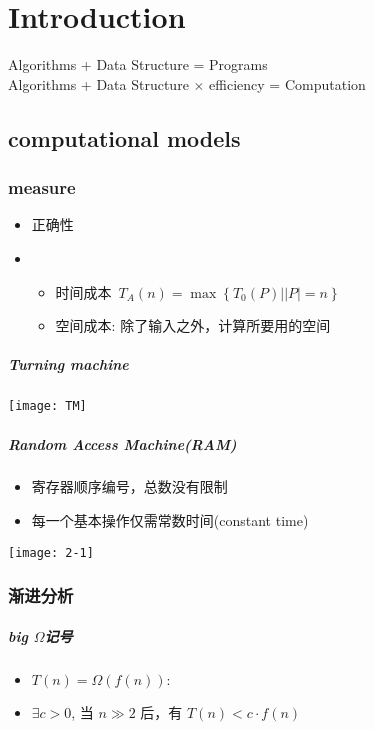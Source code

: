 \chapter{Introduction}
Algorithms + Data Structure = Programs\\
{Algorithms + Data Structure} $\times$ efficiency = Computation\\


\section{computational models}
\subsection{measure}
\begin{itemize}
\item 正确性
\item {}
\begin{itemize}
\item 时间成本\ $T_A(n) = \max \left\{T_{0}(P)|| P \mid=n\right\}$ 
\item 空间成本: 除了输入之外，计算所要用的空间
\end{itemize}
\end{itemize}

\paragraph{Turning machine}
\texttt{[image: TM]}
\paragraph{Random Access Machine(RAM)}
\begin{itemize}
\item 寄存器顺序编号，总数没有限制
\item 每一个基本操作仅需常数时间(constant time)
\end{itemize}


\texttt{[image: 2-1]}


\subsection{渐进分析}


\paragraph{big $\Omega$记号}
\begin{itemize}
\item $T(n)=\Omega(f(n)):$
\item $\exists c>0$, 当 $n\gg 2$ 后，有 $T(n) < c \cdot f(n)$
\end{itemize}

